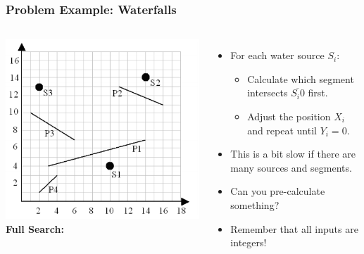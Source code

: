 \begin{frame}
  \frametitle{Problem Example: Waterfalls}
  \begin{columns}
      \includegraphics[width=1\textwidth]{img/waterfall}
    {\bf Full Search:}
    \begin{itemize}
      \item For each water source $S_i$:
      \begin{itemize}
        \item Calculate which segment intersects $\overline{S_i0}$ first.
        \item Adjust the position $X_i$ and repeat until $Y_i = 0$.
      \end{itemize}\bigskip

      \item This is a bit slow if there are many sources and segments.
      \item Can you pre-calculate something?
      \item Remember that all inputs are integers!
    \end{itemize}
  \end{columns}
\end{frame}
